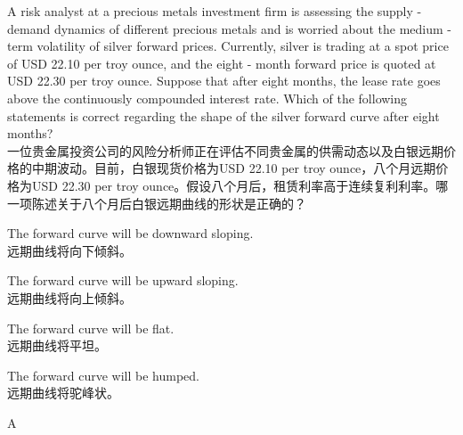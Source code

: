 \documentclass{article}
\newcounter{question} %
\begin{document}
    \begin{question}
        A risk analyst at a precious metals investment firm is assessing the supply - demand dynamics of different precious metals and is worried about the medium - term volatility of silver forward prices. Currently, silver is trading at a spot price of USD 22.10 per troy ounce, and the eight - month forward price is quoted at USD 22.30 per troy ounce. Suppose that after eight months, the lease rate goes above the continuously compounded interest rate. Which of the following statements is correct regarding the shape of the silver forward curve after eight months?
        \\一位贵金属投资公司的风险分析师正在评估不同贵金属的供需动态以及白银远期价格的中期波动。目前，白银现货价格为USD 22.10 per troy ounce，八个月远期价格为USD 22.30 per troy ounce。假设八个月后，租赁利率高于连续复利利率。哪一项陈述关于八个月后白银远期曲线的形状是正确的？
        \end{question}
        
        \begin{choices}
            \item The forward curve will be downward sloping.\\
            远期曲线将向下倾斜。
            \item The forward curve will be upward sloping.\\
            远期曲线将向上倾斜。
            \item The forward curve will be flat.\\
            远期曲线将平坦。
            \item The forward curve will be humped.\\
            远期曲线将驼峰状。
        \end{choices}
        
        \begin{correctanswer}
            A
        \end{correctanswer}
        
\end{document}

